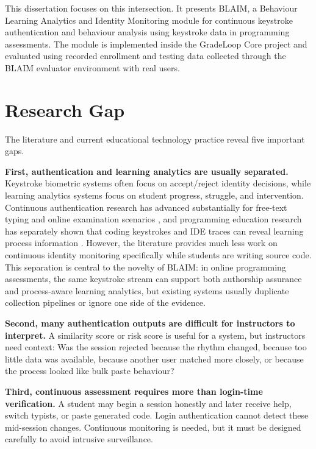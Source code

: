 This dissertation focuses on this intersection. It presents BLAIM, a Behaviour Learning Analytics and Identity Monitoring module for continuous keystroke authentication and behaviour analysis using keystroke data in programming assessments. The module is implemented inside the GradeLoop Core project and evaluated using recorded enrollment and testing data collected through the BLAIM evaluator environment with real users.

\section{Research Gap}
\label{sec:research-gap}

The literature and current educational technology practice reveal five important gaps.

\textbf{First, authentication and learning analytics are usually separated.} Keystroke biometric systems often focus on accept/reject identity decisions, while learning analytics systems focus on student progress, struggle, and intervention. Continuous authentication research has advanced substantially for free-text typing and online examination scenarios \cite{alshehri2018iterative,lu2020continuous,yang2021tkca,senarath2023reevaluating}, and programming education research has separately shown that coding keystrokes and IDE traces can reveal learning process information \cite{edwards2020keystroke,edwards2023csedm,leinonen2022ide}. However, the literature provides much less work on continuous identity monitoring specifically while students are writing source code. This separation is central to the novelty of BLAIM: in online programming assessments, the same keystroke stream can support both authorship assurance and process-aware learning analytics, but existing systems usually duplicate collection pipelines or ignore one side of the evidence.

\textbf{Second, many authentication outputs are difficult for instructors to interpret.} A similarity score or risk score is useful for a system, but instructors need context: Was the session rejected because the rhythm changed, because too little data was available, because another user matched more closely, or because the process looked like bulk paste behaviour?

\textbf{Third, continuous assessment requires more than login-time verification.} A student may begin a session honestly and later receive help, switch typists, or paste generated code. Login authentication cannot detect these mid-session changes. Continuous monitoring is needed, but it must be designed carefully to avoid intrusive surveillance.

